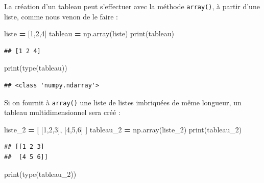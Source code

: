 \documentclass[12pt,]{book}
\newenvironment{Shaded}{\begin{snugshade}}{\end{snugshade}}
\newcommand{\DecValTok}[1]{\textcolor[rgb]{0.00,0.00,0.81}{#1}}
\newcommand{\OperatorTok}[1]{\textcolor[rgb]{0.81,0.36,0.00}{\textbf{#1}}}
\newcommand{\BuiltInTok}[1]{#1}
\newcommand{\NormalTok}[1]{#1}
\numberwithin{equation}{section}
\numberwithin{countremarque}{section}
\begin{document}
La création d'un tableau peut s'effectuer avec la méthode
\texttt{array()}, à partir d'une liste, comme nous venon de le faire :

\begin{Shaded}
\begin{Highlighting}[]
\NormalTok{liste }\OperatorTok{=}\NormalTok{ [}\DecValTok{1}\NormalTok{,}\DecValTok{2}\NormalTok{,}\DecValTok{4}\NormalTok{]}
\NormalTok{tableau }\OperatorTok{=}\NormalTok{ np.array(liste)}
\BuiltInTok{print}\NormalTok{(tableau)}
\end{Highlighting}
\end{Shaded}

\begin{lstlisting}
## [1 2 4]
\end{lstlisting}

\begin{Shaded}
\begin{Highlighting}[]
\BuiltInTok{print}\NormalTok{(}\BuiltInTok{type}\NormalTok{(tableau))}
\end{Highlighting}
\end{Shaded}

\begin{lstlisting}
## <class 'numpy.ndarray'>
\end{lstlisting}

Si on fournit à \texttt{array()} une liste de listes imbriquées de même
longueur, un tableau multidimensionnel sera créé :

\begin{Shaded}
\begin{Highlighting}[]
\NormalTok{liste_2 }\OperatorTok{=}\NormalTok{ [ [}\DecValTok{1}\NormalTok{,}\DecValTok{2}\NormalTok{,}\DecValTok{3}\NormalTok{], [}\DecValTok{4}\NormalTok{,}\DecValTok{5}\NormalTok{,}\DecValTok{6}\NormalTok{] ]}
\NormalTok{tableau_2 }\OperatorTok{=}\NormalTok{ np.array(liste_2)}
\BuiltInTok{print}\NormalTok{(tableau_2)}
\end{Highlighting}
\end{Shaded}

\begin{lstlisting}
## [[1 2 3]
##  [4 5 6]]
\end{lstlisting}

\begin{Shaded}
\begin{Highlighting}[]
\BuiltInTok{print}\NormalTok{(}\BuiltInTok{type}\NormalTok{(tableau_2))}
\end{Highlighting}
\end{Shaded}
\end{document}
